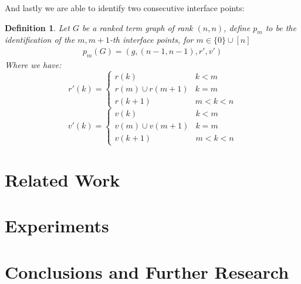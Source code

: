\documentclass[12pt]{article}
\newtheorem{definition}{Definition}
\newcommand{\1}{\mathbbm{1}}
\begin{document}
And lastly we are able to identify two consecutive interface points:

\begin{definition}
    Let $G$ be a ranked term graph of rank $(n,n)$, define $p_m$ to be the identification of the $m, m+1$-th interface points, for $m\in\{0\}\cup[n]$
    \begin{align*}
        p_m(G) = (g, (n-1, n-1), r', v')
    \end{align*}
    Where we have:
    \[
    r'(k) = \begin{cases}
        r(k) & k < m\\
        r(m) \cup r(m+1) & k = m\\
        r(k + 1) & m < k < n
    \end{cases}
    \]
        \[
    v'(k) = \begin{cases}
        v(k) & k < m\\
        v(m) \cup v(m+1) & k = m\\
        v(k + 1) & m < k < n
    \end{cases}
    \]
\end{definition}

\newpage
\section{Related Work}\label{relatedwork}

\section{Experiments}\label{experiments}

\section{Conclusions and Further Research}\label{conclusions}





\end{document}
